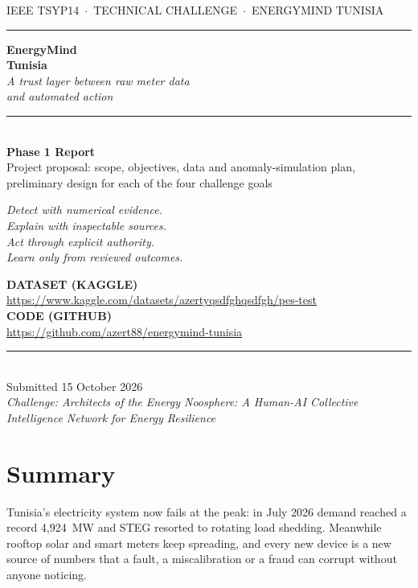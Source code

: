 \documentclass[10pt,a4paper]{article}
\let\oldsection\section
\renewcommand{\section}{\needspace{9\baselineskip}\oldsection}
\newcommand{\HFURL}{https://www.kaggle.com/datasets/azertyqsdfghqsdfgh/pes-test}
\begin{document}
\begin{titlepage}
\thispagestyle{empty}
\vspace*{-0.2cm}
{\sffamily\scriptsize IEEE TSYP14 \,$\cdot$\, TECHNICAL CHALLENGE \,$\cdot$\, ENERGYMIND TUNISIA}\\[-4pt]
\rule{\textwidth}{2.2pt}
\vspace{4.6cm}

{\sffamily\fontsize{46}{50}\selectfont\bfseries EnergyMind\\[4pt] Tunisia}\\[16pt]
{\itshape\Large A trust layer between raw meter data\\ and automated action}\\[12pt]
\rule{4.5cm}{0.9pt}\\[16pt]
{\sffamily\Large\bfseries Phase 1 Report}\\[4pt]
{\sffamily\large Project proposal: scope, objectives, data and anomaly-simulation plan, preliminary design for each of the four challenge goals}

\vspace{1.4cm}
{\itshape\small Detect with numerical evidence.\\ Explain with inspectable sources.\\ Act through explicit authority.\\ Learn only from reviewed outcomes.}

\vfill
{\sffamily\scriptsize\bfseries DATASET (KAGGLE)}\\[1pt]
{\ttfamily\scriptsize \url{\HFURL}}\\[6pt]
{\sffamily\scriptsize\bfseries CODE (GITHUB)}\\[1pt]
{\ttfamily\footnotesize \url{https://github.com/azert88/energymind-tunisia}}\\[8pt]
\rule{\textwidth}{0.8pt}\\[-2pt]
{\sffamily\scriptsize Submitted 15 October 2026}\\[1pt]
{\sffamily\scriptsize\itshape Challenge: Architects of the Energy Noosphere: A Human-AI Collective Intelligence Network for Energy Resilience}
\end{titlepage}

\section*{Summary}
Tunisia's electricity system now fails at the peak: in July 2026 demand reached a record 4,924~MW and STEG resorted to rotating load shedding. Meanwhile rooftop solar and smart meters keep spreading, and every new device is a new source of numbers that a fault, a miscalibration or a fraud can corrupt without anyone noticing.
\end{document}
